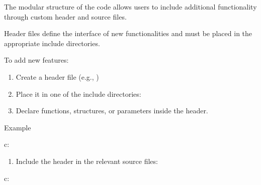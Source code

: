 \documentclass[letterpaper,10pt,english]{sphinxmanual}
\begin{document}
\sphinxAtStartPar
The modular structure of the code allows users to include additional functionality through custom header and source files.

\sphinxAtStartPar
{}

\sphinxAtStartPar
Header files define the interface of new functionalities and must be placed in the appropriate include directories.

\sphinxAtStartPar
To add new features:
\begin{enumerate}
%
\item {} 
\sphinxAtStartPar
Create a header file (e.g., )

\item {} 
\sphinxAtStartPar
Place it in one of the include directories:

\begin{sphinxVerbatim}[commandchars=\\\{\}]
\end{sphinxVerbatim}

\item {} 
\sphinxAtStartPar
Declare functions, structures, or parameters inside the header.

\end{enumerate}

\sphinxAtStartPar
Example

\sphinxAtStartPar
c:

\begin{sphinxVerbatim}[commandchars=\\\{\}]
    
\end{sphinxVerbatim}
\begin{enumerate}
%
\setcounter{enumi}{3}
\item {} 
\sphinxAtStartPar
Include the header in the relevant source files:

\end{enumerate}

\sphinxAtStartPar
c:

\begin{sphinxVerbatim}[commandchars=\\\{\}]
\end{sphinxVerbatim}
\end{document}
